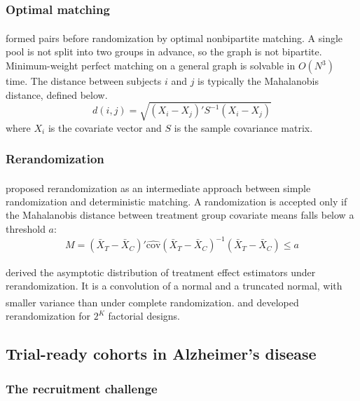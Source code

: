 \documentclass[
  11pt,
]{article}
\begin{document}
\subsubsection{Optimal matching}\label{optimal-matching}

\textsuperscript{} formed pairs before
randomization by optimal nonbipartite matching. A single
pool is not split into two groups in advance, so the graph
is not bipartite. Minimum-weight perfect matching on a
general graph is solvable in \(O(N^3)\) time. The distance
between subjects \(i\) and \(j\) is
typically the Mahalanobis distance, defined below.
\begin{equation}
  d(i,j) = \sqrt{(X_i - X_j)' S^{-1} (X_i - X_j)}
\end{equation}
where \(X_i\) is the covariate vector and \(S\) is the sample
covariance matrix.

\subsubsection{Rerandomization}\label{rerandomization}

\textsuperscript{} proposed rerandomization as an
intermediate approach between simple randomization and
deterministic matching. A randomization is accepted only if
the Mahalanobis distance between treatment group covariate
means falls below a threshold \(a\):
\begin{equation}
  M = (\bar{X}_T - \bar{X}_C)' \hat{\text{cov}}(\bar{X}_T -
    \bar{X}_C)^{-1} (\bar{X}_T - \bar{X}_C) \le a
\end{equation}

\textsuperscript{} derived the asymptotic
distribution of treatment effect estimators under
rerandomization. It is a convolution of a normal and a
truncated normal, with smaller variance than under complete
randomization.\textsuperscript{} and\textsuperscript{} developed rerandomization
for \(2^K\) factorial designs.

\subsection{Trial-ready cohorts in Alzheimer's disease}\label{trial-ready-cohorts-in-alzheimers-disease}

\subsubsection{The recruitment challenge}\label{the-recruitment-challenge}
\end{document}
